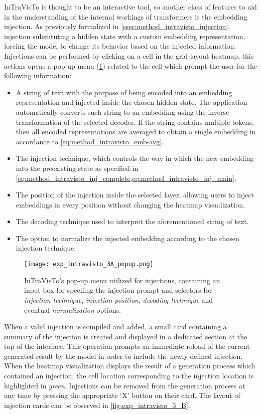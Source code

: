 InTraVisTo is thought to be an interactive tool, so another class of features to aid in the understanding of the internal workings of transformers is the embedding injection.
As previously formalized in \cref{ssec:method_intravisto_injection}, injection  substituting a hidden state with a custom embedding representation, forcing the model to change its behavior based on the injected information.
Injections can be performed by clicking on a cell in the grid-layout heatmap, this actions opens a pop-up menu (\cref{fig:exp_intravisto_3_A}) related to the cell which prompt the user for the following information:
\begin{itemize}
    \item A string of text with the purpose of being encoded into an embedding representation and injected inside the chosen hidden state.
The application automatically converts such string to an embedding using the inverse transformation of the selected decoder.
If the string contains multiple tokens, then all encoded representations are averaged to obtain a single embedding in accordance to \cref{eq:method_intravisto_emb-avg}.
    \item The injection technique, which controls the way in which the new embedding  into the preexisting state as specified in \cref{eq:method_intravisto_inj_complete,eq:method_intravisto_inj_main}.
    \item The position of the injection inside the selected layer, allowing users to inject embeddings in every position without changing the heatmap visualization.
    \item The decoding technique used to interpret the aforementioned string of text.
    \item The option to normalize the injected embedding according to the chosen injection technique. 
\end{itemize}

\begin{figure}[t!]
    \centering
    \texttt{[image: exp\_intravisto\_3A\_popup.png]}
    \caption[InTraVisTo's pop-up menu utilized for injections.]{InTraVisTo's pop-up menu utilized for injections, containing an input box for specifing the injection prompt and selectors for \emph{injection technique}, \emph{injection position}, \emph{decoding technique} and eventual \emph{normalization} options.}
    \label{fig:exp_intravisto_3_A}
\end{figure}

When a valid injection is compiled and added, a small card containing a summary of the injection is created and displayed in a dedicated section at the top of the interface.
This operation prompts an immediate reload of the current generated result by the model in order to include the newly defined injection.
When the heatmap visualization displays the result of a generation process which contained an injection, the cell location corresponding to the injection location is highlighted in \emph{green}.
Injections can be removed from the generation process at any time by pressing the appropriate `X' button on their card.
The  layout of injection cards can be observed in \cref{fig:exp_intravisto_3_B}.

